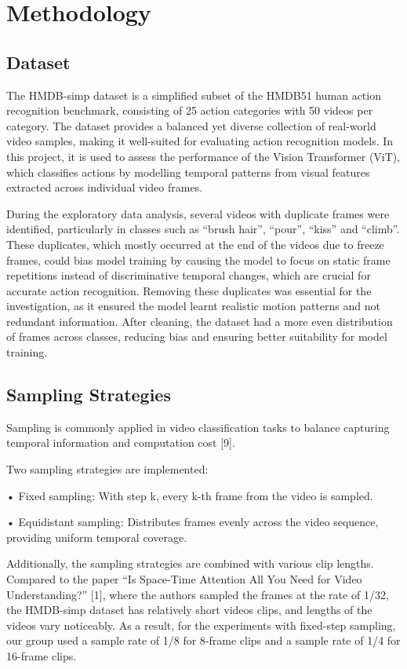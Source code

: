 \documentclass[conference]{IEEEtran}
\begin{document}
\section{Methodology}

\subsection{Dataset}
The HMDB-simp dataset is a simplified subset of the HMDB51 human action recognition benchmark, consisting of 25 action categories with 50 videos per category. The dataset provides a balanced yet diverse collection of real-world video samples, making it well-suited for evaluating action recognition models. In this project, it is used to assess the performance of the Vision Transformer (ViT), which classifies actions by modelling temporal patterns from visual features extracted across individual video frames. 

During the exploratory data analysis, several videos with duplicate frames were identified, particularly in classes such as “brush hair”, “pour”, “kiss” and “climb”. These duplicates, which mostly occurred at the end of the videos due to freeze frames, could bias model training by causing the model to focus on static frame repetitions instead of discriminative temporal changes, which are crucial for accurate action recognition. Removing these duplicates was essential for the investigation, as it ensured the model learnt realistic motion patterns and not redundant information. After cleaning, the dataset had a more even distribution of frames across classes, reducing bias and ensuring better suitability for model training. 

\subsection{Sampling Strategies}
Sampling is commonly applied in video classification tasks to balance capturing temporal information and computation cost [9]. 

Two sampling strategies are implemented:  

• Fixed sampling: With step k, every k-th frame from the video is sampled.  

• Equidistant sampling: Distributes frames evenly across the video sequence, providing uniform temporal coverage. 

Additionally, the sampling strategies are combined with various clip lengths. Compared to the paper “Is Space-Time Attention All You Need for Video Understanding?” [1], where the authors sampled the frames at the rate of 1/32, the HMDB-simp dataset has relatively short videos clips, and lengths of the videos vary noticeably. As a result, for the experiments with fixed-step sampling, our group used a sample rate of 1/8 for 8-frame clips and a sample rate of 1/4 for 16-frame clips. 
\end{document}
